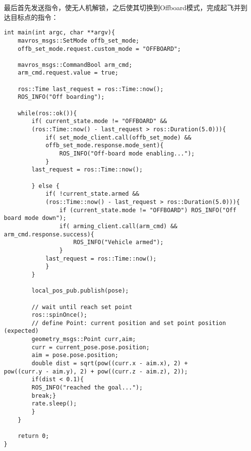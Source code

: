 最后首先发送指令，使无人机解锁，之后使其切换到Offboard模式，完成起飞并到达目标点的指令：
\begin{verbatim}
int main(int argc, char **argv){
    mavros_msgs::SetMode offb_set_mode;
    offb_set_mode.request.custom_mode = "OFFBOARD";

    mavros_msgs::CommandBool arm_cmd;
    arm_cmd.request.value = true;

    ros::Time last_request = ros::Time::now();
    ROS_INFO("Off boarding");
    
    while(ros::ok()){
        if( current_state.mode != "OFFBOARD" &&
        (ros::Time::now() - last_request > ros::Duration(5.0))){
            if( set_mode_client.call(offb_set_mode) &&
            offb_set_mode.response.mode_sent){
                ROS_INFO("Off-board mode enabling...");
            }
        last_request = ros::Time::now();

        } else {
            if( !current_state.armed &&
            (ros::Time::now() - last_request > ros::Duration(5.0))){
                if (current_state.mode != "OFFBOARD") ROS_INFO("Off board mode down");
                if( arming_client.call(arm_cmd) && arm_cmd.response.success){
                    ROS_INFO("Vehicle armed");
                }
            last_request = ros::Time::now();
            }
        }

        local_pos_pub.publish(pose);

        // wait until reach set point
        ros::spinOnce();
        // define Point: current position and set point position (expected)
        geometry_msgs::Point curr,aim;
        curr = current_pose.pose.position;
        aim = pose.pose.position;
        double dist = sqrt(pow((curr.x - aim.x), 2) +
pow((curr.y - aim.y), 2) + pow((curr.z - aim.z), 2));
        if(dist < 0.1){
        ROS_INFO("reached the goal...");
        break;}
        rate.sleep();
        }
    }

    return 0;
}
\end{verbatim}











